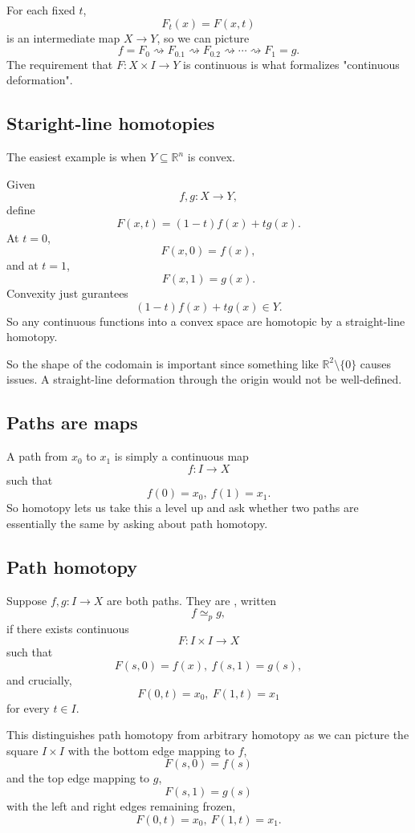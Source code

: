 \documentclass[11pt]{article}
\begin{document}
For each fixed $t$, 
\[
    F_t(x) = F(x,t)
\]
is an intermediate map $X \to Y$, so 
we can picture 
\[
    f = F_0 \rightsquigarrow F_{0.1} \rightsquigarrow 
     F_{0.2} \rightsquigarrow 
    \cdots \rightsquigarrow  F_{1} = g. 
\]
The requirement that $F : X \times I \to Y$ is 
continuous is what formalizes "continuous deformation".

\subsection{Staright-line homotopies}

The easiest example is when $Y \subseteq \mathbb R^n$ 
is convex. 

Given 
\[
    f,g : X \to Y, 
\]
define 
\[
    F(x,t) = (1-t)f(x) + tg(x). 
\]
At $t = 0$, 
\[
    F(x,0) = f(x),
\]
and at $t = 1$, 
\[
    F(x,1) = g(x). 
\]
Convexity just gurantees 
\[
    (1-t)f(x) + tg(x) \in Y.
\]
So any continuous functions into a convex 
space are homotopic by a straight-line 
homotopy. 

So the shape of the codomain is important since something like 
$\mathbb R^2 \setminus \{0\}$ causes issues. 
A straight-line deformation through the origin would 
not be well-defined. 

\subsection{Paths are maps}

A path from $x_0$ to $x_1$ is simply a continuous map 
\[
    f : I \to X
\]
such that 
\[
    f(0) = x_0, \ f(1) = x_1. 
\]
So homotopy lets us take this a level up and ask 
whether two paths are essentially the same by 
asking about path homotopy. 

\subsection{Path homotopy}
Suppose $f,g : I \to X$ are 
both paths. 
They are , written 
\[
    f \simeq_p g, 
\]
if there exists continuous 
\[
    F : I \times I \to X 
\]
such that 
\[
    F(s,0) = f(x), \ f(s,1) = g(s),
\]
and crucially, 
\[
    F(0,t) = x_0, \ F(1,t) = x_1 
\]
for every $t \in I$. 

This distinguishes path homotopy from arbitrary 
homotopy as we can picture the square 
$I \times I$ with the bottom edge mapping to 
$f$, 
\[
    F(s,0) = f(s) 
\]
and the top edge mapping to $g$, 
\[
    F(s,1) = g(s)
\]
with the left and right edges remaining frozen, 
\[
    F(0,t) = x_0, \ F(1, t) = x_1. 
\]
\end{document}
